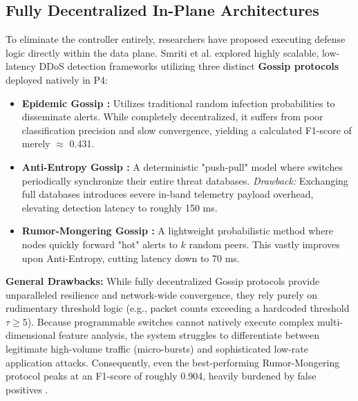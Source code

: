\documentclass[sigconf, nonacm]{acmart}
\begin{document}
\subsection{Fully Decentralized In-Plane Architectures}
To eliminate the controller entirely, researchers have proposed executing defense logic directly within the data plane. Smriti et al. \cite{smriti2026, smriti2023} explored highly scalable, low-latency DDoS detection frameworks utilizing three distinct \textbf{Gossip protocols} deployed natively in P4:

\begin{itemize}
    \item \textbf{Epidemic Gossip \cite{smriti2023}:} Utilizes traditional random infection probabilities to disseminate alerts. While completely decentralized, it suffers from poor classification precision and slow convergence, yielding a calculated F1-score of merely $\approx$ 0.431.
    \item \textbf{Anti-Entropy Gossip \cite{smriti2026}:} A deterministic "push-pull" model where switches periodically synchronize their entire threat databases. \textit{Drawback:} Exchanging full databases introduces severe in-band telemetry payload overhead, elevating detection latency to roughly 150 ms.
    \item \textbf{Rumor-Mongering Gossip \cite{smriti2026}:} A lightweight probabilistic method where nodes quickly forward "hot" alerts to $k$ random peers. This vastly improves upon Anti-Entropy, cutting latency down to 70 ms.
\end{itemize}

\textbf{General Drawbacks:} While fully decentralized Gossip protocols provide unparalleled resilience and network-wide convergence, they rely purely on rudimentary threshold logic (e.g., packet counts exceeding a hardcoded threshold $\tau \ge 5$). Because programmable switches cannot natively execute complex multi-dimensional feature analysis, the system struggles to differentiate between legitimate high-volume traffic (micro-bursts) and sophisticated low-rate application attacks. Consequently, even the best-performing Rumor-Mongering protocol peaks at an F1-score of roughly 0.904, heavily burdened by false positives \cite{smriti2026}.
\end{document}
